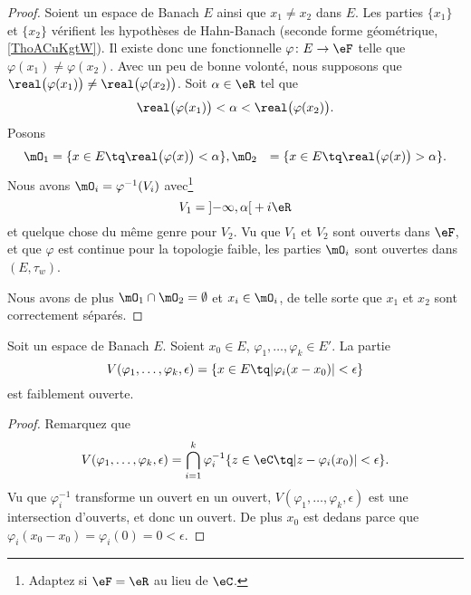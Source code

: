 \begin{proof}
	Soient un espace de Banach \( E\) ainsi que \( x_1\neq x_2\) dans \( E\). Les parties \( \{ x_1 \}\) et \( \{ x_2 \}\) vérifient les hypothèses de Hahn-Banach (seconde forme géométrique, \ref{ThoACuKgtW}). Il existe donc une fonctionnelle \( \varphi\colon E\to \eF\) telle que \( \varphi(x_1)\neq \varphi(x_2)\). Avec un peu de bonne volonté, nous supposons que \( \real\big( \varphi(x_1) \big)\neq \real\big( \varphi(x_2) \big)\). Soit \( \alpha\in \eR\) tel que
	\begin{equation}
		\real\big( \varphi(x_1) \big)<\alpha <\real\big( \varphi(x_2) \big).
	\end{equation}
	Posons
	\begin{subequations}
		\begin{align}
			\mO_1 & =\{ x\in E\tq\real\big( \varphi(x) \big)< \alpha \},
			\mO_2 & =\{ x\in E\tq\real\big( \varphi(x) \big)> \alpha \}.
		\end{align}
	\end{subequations}
	Nous avons \( \mO_i=\varphi^{-1}(V_i)\) avec\footnote{Adaptez si \( \eF=\eR\) au lieu de \( \eC\).}
	\begin{equation}
		V_1= \mathopen] -\infty , \alpha \mathclose[+i\eR
	\end{equation}
	et quelque chose du même genre pour \( V_2\). Vu que \( V_1\) et \( V_2\) sont ouverts dans \( \eF\), et que \( \varphi\) est continue pour la topologie faible, les parties \( \mO_i\) sont ouvertes dans \( (E,\tau_w)\).

	Nous avons de plus \( \mO_1\cap\mO_2=\emptyset\) et \( x_i\in \mO_i\), de telle sorte que \( x_1\) et \( x_2\) sont correctement séparés.
\end{proof}

\begin{lemma}
	Soit un espace de Banach \( E\). Soient \( x_0\in E\), \( \varphi_1,\ldots, \varphi_k\in E'\). La partie
	\begin{equation}
		V(\varphi_1,\ldots, \varphi_k,\epsilon)=\{ x\in E\tq | \varphi_i(x-x_0) |<\epsilon \}
	\end{equation}
	est faiblement ouverte.
\end{lemma}

\begin{proof}
	Remarquez que
	\begin{equation}
		V(\varphi_1,\ldots, \varphi_k,\epsilon)=\bigcap_{i=1}^k\varphi_i^{-1}\{ z\in \eC\tq | z-\varphi_i(x_0) | <\epsilon \}.
	\end{equation}
	Vu que \( \varphi_i^{-1}\) transforme un ouvert en un ouvert, \( V(\varphi_1,\ldots, \varphi_k,\epsilon)\) est une intersection d'ouverts, et donc un ouvert. De plus \( x_0\) est dedans parce que \( \varphi_i(x_0-x_0)=\varphi_i(0)=0 <\epsilon\).
\end{proof}

